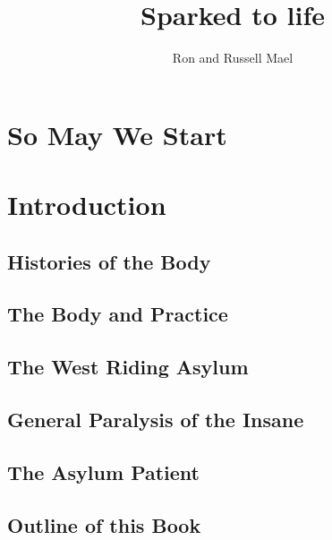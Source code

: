 \documentclass[
  openany]{book}
\title{Sparked to life}
\author{Ron and Russell Mael}
\date{}
\begin{document}
\maketitle

{
\setcounter{tocdepth}{1}
\tableofcontents
}
\hypertarget{so-may-we-start}{%
\chapter{So May We Start}\label{so-may-we-start}}

\hypertarget{introduction}{%
\chapter{Introduction}\label{introduction}}

\hypertarget{histories-of-the-body}{%
\section{Histories of the Body}\label{histories-of-the-body}}

\hypertarget{the-body-and-practice}{%
\section{The Body and Practice}\label{the-body-and-practice}}

\hypertarget{the-west-riding-asylum}{%
\section{The West Riding Asylum}\label{the-west-riding-asylum}}

\hypertarget{general-paralysis-of-the-insane}{%
\section{General Paralysis of the Insane}\label{general-paralysis-of-the-insane}}

\hypertarget{the-asylum-patient}{%
\section{The Asylum Patient}\label{the-asylum-patient}}

\hypertarget{outline-of-this-book}{%
\section{Outline of this Book}\label{outline-of-this-book}}
\end{document}
